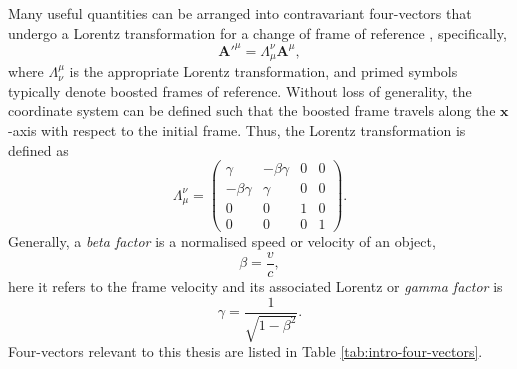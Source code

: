 Many useful quantities can be arranged into contravariant four-vectors that undergo a Lorentz transformation for a change of frame of reference \cite{steaneRelativityMadeRelatively2012}, specifically, 
\begin{equation}
	\mathbf{A}'^\mu =\Lambda_\mu^\nu \mathbf{A}^\mu,
\end{equation}
where $\Lambda^\mu_\nu$ is the appropriate Lorentz transformation, and primed symbols typically denote boosted frames of reference. Without loss of generality, the coordinate system can be defined such that the boosted frame travels along the $\mathbf{x}$-axis with respect to the initial frame. Thus, the Lorentz transformation is defined as
\begin{equation}\label{eq:zvp_lorentz}
	\Lambda_\mu^\nu = \begin{pmatrix}
		\gamma & -\beta\gamma & 0 & 0\\
		-\beta\gamma & \gamma & 0 & 0\\
		0 & 0& 1 & 0\\
		0 & 0 & 0 & 1
	\end{pmatrix}.
\end{equation}
Generally, a \textit{beta factor} is a normalised speed or velocity of an object,
\begin{equation}
	\beta = \frac{v}{c}, 
\end{equation}
here it refers to the frame velocity and its associated Lorentz or \textit{gamma factor} is
\begin{equation}
	\gamma = \frac{1}{\sqrt{1-\beta^2}}.
\end{equation}
Four-vectors relevant to this thesis are listed in Table \ref{tab:intro-four-vectors}.
